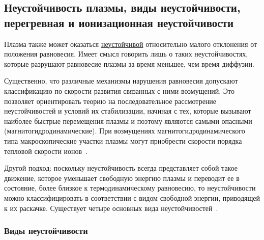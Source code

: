 \documentclass[10pt, a4paper]{article}
\begin{document}
\subsection{Неустойчивость плазмы, виды неустойчивости, перегревная и ионизационная неустойчивости}

Плазма также может оказаться
\uline{неустойчивой} относительно малого отклонения от положения равновесия. Имеет смысл говорить лишь о таких неустойчивостях, которые разрушают равновесие плазмы за время меньшее, чем время диффузии.

Существенно, что различные механизмы нарушения равновесия допускают классификацию по скорости развития связанных с ними возмущений. Это позволяет ориентировать теорию на последовательное рассмотрение неустойчивостей и условий их стабилизации, начиная с тех, которые вызывают наиболее быстрые перемещения плазмы и поэтому являются самыми опасными (магнитогидродинамические). При возмущениях магнитогидродинамического типа макроскопические участки плазмы могут приобрести скорости порядка тепловой скорости ионов~\cite{arzimovich}. 

Другой подход: поскольку неустойчивость всегда представляет собой такое движение, которое уменьшает свободную энергию плазмы и переводит ее в состояние, более близкое к термодинамическому равновесию, то неустойчивости можно классифицировать в соответствии с видом свободной энергии, приводящей к их раскачке. Существует
четыре основных вида неустойчивостей~\cite{chen}.

\subsubsection{Виды неустойчивости}
\end{document}
